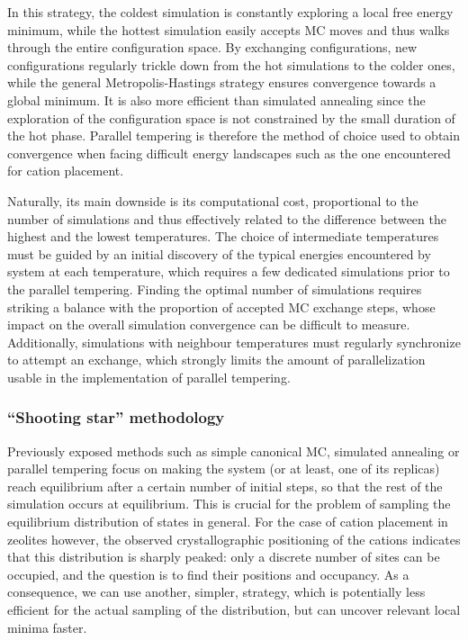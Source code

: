\documentclass[main.tex]{subfiles}
\begin{document}
In this strategy, the coldest simulation is constantly exploring a local free energy minimum, while the hottest simulation easily accepts MC moves and thus walks through the entire configuration space. By exchanging configurations, new configurations regularly trickle down from the hot simulations to the colder ones, while the general Metropolis-Hastings strategy ensures convergence towards a global minimum. It is also more efficient than simulated annealing since the exploration of the configuration space is not constrained by the small duration of the hot phase. Parallel tempering is therefore the method of choice used to obtain convergence when facing difficult energy landscapes such as the one encountered for cation placement.

Naturally, its main downside is its computational cost, proportional to the number of simulations and thus effectively related to the difference between the highest and the lowest temperatures. The choice of intermediate temperatures must be guided by an initial discovery of the typical energies encountered by system at each temperature, which requires a few dedicated simulations prior to the parallel tempering. Finding the optimal number of simulations requires striking a balance with the proportion of accepted MC exchange steps, whose impact on the overall simulation convergence can be difficult to measure. Additionally, simulations with neighbour temperatures must regularly synchronize to attempt an exchange, which strongly limits the amount of parallelization usable in the implementation of parallel tempering.

\subsubsection{``Shooting star'' methodology}

Previously exposed methods such as simple canonical MC, simulated annealing or parallel tempering focus on making the system (or at least, one of its replicas) reach equilibrium after a certain number of initial steps, so that the rest of the simulation occurs at equilibrium. This is crucial for the problem of sampling the equilibrium distribution of states in general. For the case of cation placement in zeolites however, the observed crystallographic positioning of the cations indicates that this distribution is sharply peaked: only a discrete number of sites can be occupied, and the question is to find their positions and occupancy. As a consequence, we can use another, simpler, strategy, which is potentially less efficient for the actual sampling of the distribution, but can uncover relevant local minima faster.
\end{document}
